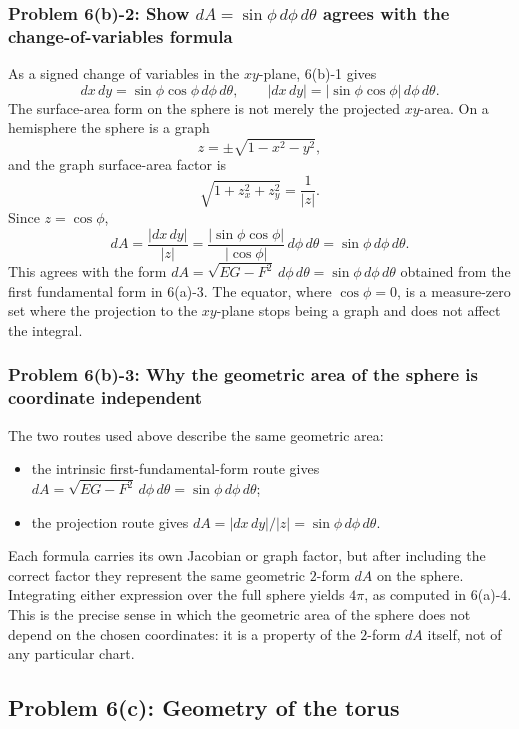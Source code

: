 \documentclass[11pt]{article}
\begin{document}
\subsubsection*{Problem 6(b)-2: Show $dA=\sin\phi\,d\phi\,d\theta$ agrees with the change-of-variables formula}

As a signed change of variables in the $xy$-plane, 6(b)-1 gives
\[
 dx\,dy=\sin\phi\cos\phi\,d\phi\,d\theta,
\qquad
 |dx\,dy|=|\sin\phi\cos\phi|\,d\phi\,d\theta.
\]
The surface-area form on the sphere is not merely the projected $xy$-area. On a hemisphere the sphere is a graph
\[
 z=\pm\sqrt{1-x^2-y^2},
\]
and the graph surface-area factor is
\[
 \sqrt{1+z_x^2+z_y^2}=\frac{1}{|z|}.
\]
Since $z=\cos\phi$,
\[
 dA=\frac{|dx\,dy|}{|z|}
 =
 \frac{|\sin\phi\cos\phi|}{|\cos\phi|}\,
 d\phi\,d\theta
 =
 \sin\phi\,d\phi\,d\theta.
\]
This agrees with the form $dA=\sqrt{EG-F^2}\,d\phi\,d\theta=\sin\phi\,d\phi\,d\theta$ obtained from the first fundamental form in 6(a)-3. The equator, where $\cos\phi=0$, is a measure-zero set where the projection to the $xy$-plane stops being a graph and does not affect the integral.

\subsubsection*{Problem 6(b)-3: Why the geometric area of the sphere is coordinate independent}

The two routes used above describe the same geometric area:
\begin{itemize}
\item the intrinsic first-fundamental-form route gives $dA=\sqrt{EG-F^2}\,d\phi\,d\theta=\sin\phi\,d\phi\,d\theta$;
\item the projection route gives $dA=|dx\,dy|/|z|=\sin\phi\,d\phi\,d\theta$.
\end{itemize}
Each formula carries its own Jacobian or graph factor, but after including the correct factor they represent the same geometric $2$-form $dA$ on the sphere. Integrating either expression over the full sphere yields $4\pi$, as computed in 6(a)-4. This is the precise sense in which the geometric area of the sphere does not depend on the chosen coordinates: it is a property of the $2$-form $dA$ itself, not of any particular chart.

\subsection*{Problem 6(c): Geometry of the torus}
\end{document}
